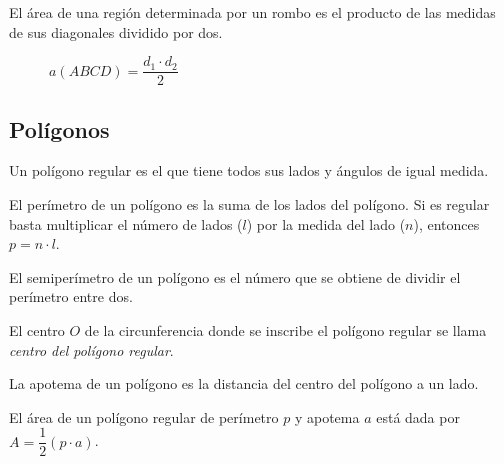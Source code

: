 \begin{theorem}
    El área de una región determinada por un rombo es el producto de las medidas de sus diagonales dividido por dos.

    \begin{figure}[!h]
        \centering
        
        \caption{$a(ABCD) = \dfrac{d_1 \cdot d_2}{2}$}
        \label{fig:area-rombus}
    \end{figure}    
\end{theorem}

\clearpage

\subsection{Polígonos}

\begin{definition}
    Un polígono regular es el que tiene todos sus lados y ángulos de igual medida.
\end{definition}

\begin{definition}
    El perímetro de un polígono es la suma de los lados del polígono. Si es regular basta multiplicar el número de lados ($l$) por la medida del lado ($n$), entonces $p = n \cdot l$.
\end{definition}

\begin{definition}
    El semiperímetro de un polígono es el número que se obtiene de dividir el perímetro entre dos.
\end{definition}

\begin{definition}
    El centro $O$ de la circunferencia donde se inscribe el polígono regular se llama \textit{centro del polígono regular}.
\end{definition}

\begin{definition}
    La apotema de un polígono es la distancia del centro del polígono a un lado.
\end{definition}

\begin{theorem}
    El área de un polígono regular de perímetro $p$ y apotema $a$ está dada por $A = \dfrac{1}{2}(p \cdot a)$.
\end{theorem}

